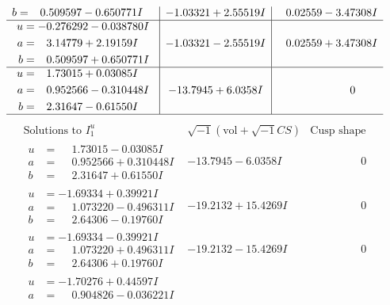 \documentclass[1p]{elsarticle_modified}
\theoremstyle{definition}
\newcommand{\I}{\sqrt{-1}}
\begin{document}
$$\begin{array}{c|c|c}
\begin{aligned}
b &= \phantom{-}0.509597 - 0.650771 I\end{aligned}
 & -1.03321 + 2.55519 I & \phantom{-}0.02559 - 3.47308 I \\ \hline\begin{aligned}
u &= -0.276292 - 0.038780 I \\
a &= \phantom{-}3.14779 + 2.19159 I \\
b &= \phantom{-}0.509597 + 0.650771 I\end{aligned}
 & -1.03321 - 2.55519 I & \phantom{-}0.02559 + 3.47308 I \\ \hline\begin{aligned}
u &= \phantom{-}1.73015 + 0.03085 I \\
a &= \phantom{-}0.952566 - 0.310448 I \\
b &= \phantom{-}2.31647 - 0.61550 I\end{aligned}
 & -13.7945 + 6.0358 I & \phantom{-0.000000 } 0\\
 \hline 
 \end{array}$$\newpage$$\begin{array}{c|c|c}  
\text{Solutions to }I^u_{1}& \I (\text{vol} + \sqrt{-1}CS) & \text{Cusp shape}\\
 \hline 
\begin{aligned}
u &= \phantom{-}1.73015 - 0.03085 I \\
a &= \phantom{-}0.952566 + 0.310448 I \\
b &= \phantom{-}2.31647 + 0.61550 I\end{aligned}
 & -13.7945 - 6.0358 I & \phantom{-0.000000 } 0 \\ \hline\begin{aligned}
u &= -1.69334 + 0.39921 I \\
a &= \phantom{-}1.073220 - 0.496311 I \\
b &= \phantom{-}2.64306 - 0.19760 I\end{aligned}
 & -19.2132 + 15.4269 I & \phantom{-0.000000 } 0 \\ \hline\begin{aligned}
u &= -1.69334 - 0.39921 I \\
a &= \phantom{-}1.073220 + 0.496311 I \\
b &= \phantom{-}2.64306 + 0.19760 I\end{aligned}
 & -19.2132 - 15.4269 I & \phantom{-0.000000 } 0 \\ \hline\begin{aligned}
u &= -1.70276 + 0.44597 I \\
a &= \phantom{-}0.904826 - 0.036221 I \\

\end{aligned}
\end{array}$$
\end{document}
